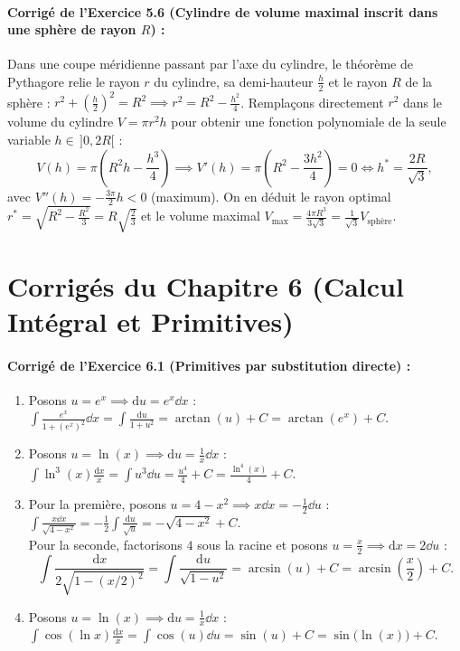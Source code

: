 \paragraph{Corrigé de l'Exercice 5.6 (Cylindre de volume maximal inscrit dans une sphère de rayon $R$) :}
Dans une coupe méridienne passant par l'axe du cylindre, le théorème de Pythagore relie le rayon $r$ du cylindre, sa demi-hauteur $\frac{h}{2}$ et le rayon $R$ de la sphère : $r^2 + \left(\frac{h}{2}\right)^2 = R^2 \implies r^2 = R^2 - \frac{h^2}{4}$.
Remplaçons directement $r^2$ dans le volume du cylindre $V = \pi r^2 h$ pour obtenir une fonction polynomiale de la seule variable $h \in \,]0, 2R[$ :
\[
    V(h) = \pi\left(R^2 h - \frac{h^3}{4}\right) \implies V'(h) = \pi\left(R^2 - \frac{3h^2}{4}\right) = 0 \iff \boxed{h^* = \frac{2R}{\sqrt{3}}},
\]
avec $V''(h) = -\frac{3\pi}{2}h < 0$ (maximum). On en déduit le rayon optimal $r^* = \sqrt{R^2 - \frac{R^2}{3}} = \boxed{R\sqrt{\frac{2}{3}}}$ et le volume maximal $\boxed{V_{\max} = \frac{4\pi R^3}{3\sqrt{3}} = \frac{1}{\sqrt{3}}V_{\text{sphère}}}$.

\section{Corrigés du Chapitre 6 (Calcul Intégral et Primitives)}

\paragraph{Corrigé de l'Exercice 6.1 (Primitives par substitution directe) :}
\begin{enumerate}[label=(\alph*)]
    \item Posons $u = e^x \implies \mathrm{d}u = e^x\dd x$ : $\displaystyle\int \frac{e^x}{1 + (e^x)^2}\dd x = \int \frac{\mathrm{d}u}{1 + u^2} = \arctan(u) + C = \boxed{\arctan(e^x) + C}$.
    \item Posons $u = \ln(x) \implies \mathrm{d}u = \frac{1}{x}\dd x$ : $\displaystyle\int \ln^3(x)\frac{\mathrm{d}x}{x} = \int u^3\dd u = \frac{u^4}{4} + C = \boxed{\frac{\ln^4(x)}{4} + C}$.
    \item Pour la première, posons $u = 4 - x^2 \implies x\dd x = -\frac{1}{2}\dd u$ : $\displaystyle\int \frac{x\dd x}{\sqrt{4-x^2}} = -\frac{1}{2}\int \frac{\mathrm{d}u}{\sqrt{u}} = \boxed{-\sqrt{4 - x^2} + C}$.\\
    Pour la seconde, factorisons $4$ sous la racine et posons $u = \frac{x}{2} \implies \mathrm{d}x = 2\dd u$ :
    \[
        \int \frac{\mathrm{d}x}{2\sqrt{1 - (x/2)^2}} = \int \frac{\mathrm{d}u}{\sqrt{1 - u^2}} = \arcsin(u) + C = \boxed{\arcsin\left(\frac{x}{2}\right) + C}.
    \]
    \item Posons $u = \ln(x) \implies \mathrm{d}u = \frac{1}{x}\dd x$ : $\displaystyle\int \cos(\ln x)\frac{\mathrm{d}x}{x} = \int \cos(u)\dd u = \sin(u) + C = \boxed{\sin\bigl(\ln(x)\bigr) + C}$.
\end{enumerate}

